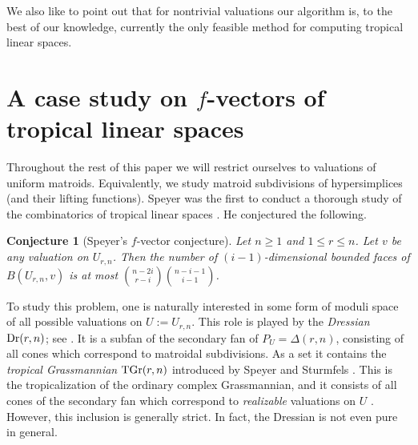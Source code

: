 \documentclass[11pt,a4paper]{amsart}
\theoremstyle{definition}
\theoremstyle{plain}
\newtheorem{conjecture}[definition]{Conjecture}
\begin{document}
We also like to point out that for nontrivial valuations our algorithm is, to the best of our knowledge, currently the only feasible method for computing tropical linear spaces.

 
\section{A case study on \texorpdfstring{$f$}{f}-vectors of tropical linear spaces}
\noindent
Throughout the rest of this paper we will restrict ourselves to valuations of uniform matroids.
Equivalently, we study matroid subdivisions of hypersimplices (and their lifting functions).
Speyer was the first to conduct a thorough study of the combinatorics of tropical linear spaces \cite{Speyer:2008}.
He conjectured the following.
\begin{conjecture}[Speyer's $f$-vector conjecture]\label{con:speyer}
 Let $n \geq 1$ and $1 \leq r \leq n$. Let $v$ be any valuation on $U_{r,n}$. Then the number of $(i-1)$-dimensional bounded faces of $B(U_{r,n},v)$ is at most $\binom{n-2i}{r-i} \binom{n-i-1}{i-1}$.
\end{conjecture} 

To study this problem, one is naturally interested in some form of moduli space of all possible valuations on $U := U_{r,n}$.
This role is played by the \emph{Dressian} ${\textnormal{Dr}}(r,n)$; see \cite{HerrmannJensenJoswigSturmfels:2009,HerrmannJoswigSpeyer:2012}.
It is a subfan of the secondary fan of $P_U = \Delta(r,n)$, consisting of all cones which correspond to matroidal subdivisions.
As a set it contains the \emph{tropical Grassmannian} ${\textnormal{TGr}}(r,n)$ introduced by Speyer and Sturmfels \cite{SpeyerSturmfels:2004}.
This is the tropicalization of the ordinary complex Grassmannian, and it consists of all cones of the secondary fan which correspond to \emph{realizable} valuations on $U$ \cite[Chapter 4]{Tropical+Book}.
However, this inclusion is generally strict.
In fact, the Dressian is not even pure in general.
\end{document}
